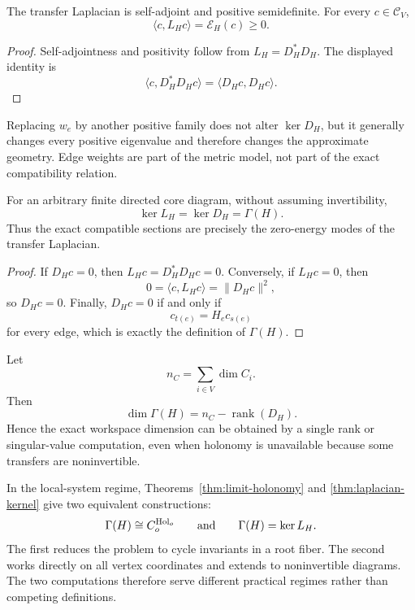 \begin{proposition}\label{prop:laplacian-positive}
The transfer Laplacian is self-adjoint and positive semidefinite. For every
\(c\in\mathcal C_V\),
\[
\langle c,L_Hc\rangle=\mathcal E_H(c)\geq0.
\]
\end{proposition}

\begin{proof}
Self-adjointness and positivity follow from \(L_H=D_H^*D_H\). The displayed
identity is
\[
\langle c,D_H^*D_Hc\rangle
=
\langle D_Hc,D_Hc\rangle.
\]
\end{proof}

\begin{remark}
Replacing \(w_e\) by another positive family does not alter \(\ker D_H\), but
it generally changes every positive eigenvalue and therefore changes the
approximate geometry. Edge weights are part of the metric model, not part of
the exact compatibility relation.
\end{remark}


\begin{theorem}\label{thm:laplacian-kernel}
For an arbitrary finite directed core diagram, without assuming invertibility,
\[
\boxed{
\ker L_H=\ker D_H=\Gamma(H).
}
\]
Thus the exact compatible sections are precisely the zero-energy modes of the
transfer Laplacian.
\end{theorem}

\begin{proof}
If \(D_Hc=0\), then \(L_Hc=D_H^*D_Hc=0\). Conversely, if \(L_Hc=0\), then
\[
0=\langle c,L_Hc\rangle=\|D_Hc\|^2,
\]
so \(D_Hc=0\). Finally, \(D_Hc=0\) if and only if
\[
c_{t(e)}=H_ec_{s(e)}
\]
for every edge, which is exactly the definition of \(\Gamma(H)\).
\end{proof}

\begin{corollary}\label{cor:workspace-rank-D}
Let
\[
n_C=\sum_{i\in V}\dim C_i.
\]
Then
\[
\boxed{
\dim\Gamma(H)=n_C-\operatorname{rank}(D_H).
}
\]
Hence the exact workspace dimension can be obtained by a single rank or
singular-value computation, even when holonomy is unavailable because some
transfers are noninvertible.
\end{corollary}


In the local-system regime, Theorems~\ref{thm:limit-holonomy} and
\ref{thm:laplacian-kernel} give two equivalent constructions:
\[
\Gamma(H)
\cong
C_o^{\operatorname{Hol}_o}
\qquad\text{and}\qquad
\Gamma(H)=\ker L_H.
\]
The first reduces the problem to cycle invariants in a root fiber. The second
works directly on all vertex coordinates and extends to noninvertible diagrams.
The two computations therefore serve different practical regimes rather than
competing definitions.

